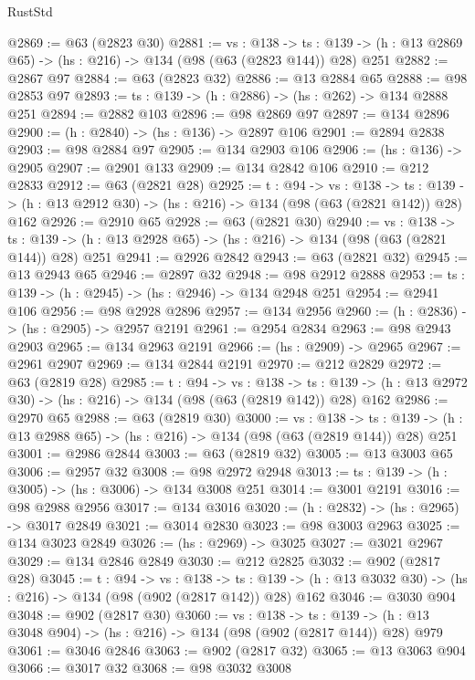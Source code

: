 \begin{lexlean}{RustStd}
\begin{coremodule}
@2869 := @63 (@2823 @30)
@2881 := {vs : @138} ->
  {ts : @139} -> (h : @13 @2869 @65) -> (hs : @216) -> @134 (@98 (@63 (@2823 @144)) @28) @251
@2882 := @2867 @97
@2884 := @63 (@2823 @32)
@2886 := @13 @2884 @65
@2888 := @98 @2853 @97
@2893 := {ts : @139} -> (h : @2886) -> (hs : @262) -> @134 @2888 @251
@2894 := @2882 @103
@2896 := @98 @2869 @97
@2897 := @134 @2896
@2900 := (h : @2840) -> (hs : @136) -> @2897 @106
@2901 := @2894 @2838
@2903 := @98 @2884 @97
@2905 := @134 @2903 @106
@2906 := (hs : @136) -> @2905
@2907 := @2901 @133
@2909 := @134 @2842 @106
@2910 := @212 @2833
@2912 := @63 (@2821 @28)
@2925 := {t : @94} ->
  {vs : @138} ->
  {ts : @139} -> (h : @13 @2912 @30) -> (hs : @216) -> @134 (@98 (@63 (@2821 @142)) @28) @162
@2926 := @2910 @65
@2928 := @63 (@2821 @30)
@2940 := {vs : @138} ->
  {ts : @139} -> (h : @13 @2928 @65) -> (hs : @216) -> @134 (@98 (@63 (@2821 @144)) @28) @251
@2941 := @2926 @2842
@2943 := @63 (@2821 @32)
@2945 := @13 @2943 @65
@2946 := @2897 @32
@2948 := @98 @2912 @2888
@2953 := {ts : @139} -> (h : @2945) -> (hs : @2946) -> @134 @2948 @251
@2954 := @2941 @106
@2956 := @98 @2928 @2896
@2957 := @134 @2956
@2960 := (h : @2836) -> (hs : @2905) -> @2957 @2191
@2961 := @2954 @2834
@2963 := @98 @2943 @2903
@2965 := @134 @2963 @2191
@2966 := (hs : @2909) -> @2965
@2967 := @2961 @2907
@2969 := @134 @2844 @2191
@2970 := @212 @2829
@2972 := @63 (@2819 @28)
@2985 := {t : @94} ->
  {vs : @138} ->
  {ts : @139} -> (h : @13 @2972 @30) -> (hs : @216) -> @134 (@98 (@63 (@2819 @142)) @28) @162
@2986 := @2970 @65
@2988 := @63 (@2819 @30)
@3000 := {vs : @138} ->
  {ts : @139} -> (h : @13 @2988 @65) -> (hs : @216) -> @134 (@98 (@63 (@2819 @144)) @28) @251
@3001 := @2986 @2844
@3003 := @63 (@2819 @32)
@3005 := @13 @3003 @65
@3006 := @2957 @32
@3008 := @98 @2972 @2948
@3013 := {ts : @139} -> (h : @3005) -> (hs : @3006) -> @134 @3008 @251
@3014 := @3001 @2191
@3016 := @98 @2988 @2956
@3017 := @134 @3016
@3020 := (h : @2832) -> (hs : @2965) -> @3017 @2849
@3021 := @3014 @2830
@3023 := @98 @3003 @2963
@3025 := @134 @3023 @2849
@3026 := (hs : @2969) -> @3025
@3027 := @3021 @2967
@3029 := @134 @2846 @2849
@3030 := @212 @2825
@3032 := @902 (@2817 @28)
@3045 := {t : @94} ->
  {vs : @138} ->
  {ts : @139} -> (h : @13 @3032 @30) -> (hs : @216) -> @134 (@98 (@902 (@2817 @142)) @28) @162
@3046 := @3030 @904
@3048 := @902 (@2817 @30)
@3060 := {vs : @138} ->
  {ts : @139} -> (h : @13 @3048 @904) -> (hs : @216) -> @134 (@98 (@902 (@2817 @144)) @28) @979
@3061 := @3046 @2846
@3063 := @902 (@2817 @32)
@3065 := @13 @3063 @904
@3066 := @3017 @32
@3068 := @98 @3032 @3008

\end{coremodule}
\end{lexlean}

